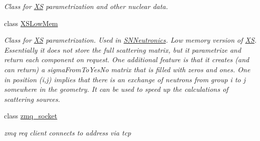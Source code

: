 \begin{DoxyCompactItemize}
\begin{DoxyCompactList}\small\item\em Class for \hyperlink{classFoam_1_1XS}{XS} parametrization and other nuclear data. \end{DoxyCompactList}\item 
class \hyperlink{classFoam_1_1XSLowMem}{X\+S\+Low\+Mem}
\begin{DoxyCompactList}\small\item\em Class for \hyperlink{classFoam_1_1XS}{XS} parametrization. Used in \hyperlink{classFoam_1_1SNNeutronics}{S\+N\+Neutronics}. Low memory version of \hyperlink{classFoam_1_1XS}{XS}. Essentially it does not store the full scattering matrix, but it parametrize and return each component on request. One additional feature is that it creates (and can return) a sigma\+From\+To\+Yes\+No matrix that is filled with zeros and ones. One in position (i,j) implies that there is an exchange of neutrons from group i to j somewhere in the geometry. It can be used to speed up the calculations of scattering sources. \end{DoxyCompactList}\item 
class \hyperlink{classFoam_1_1zmq__socket}{zmq\+\_\+socket}
\begin{DoxyCompactList}\small\item\em zmq req client connects to address via tcp \end{DoxyCompactList}\end{DoxyCompactItemize}
